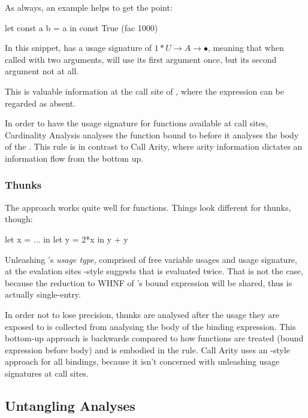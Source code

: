 As always, an example helps to get the point:
\begin{haskellcode}
  let const a b = a
  in const True (fac 1000) 
\end{haskellcode}

In this snippet,  has a usage signature of $1*U \to A \to \bullet$, meaning that when called with two arguments,  will use its first argument once, but its second argument not at all.

This is valuable information at the call site of , where the expression  can be regarded as absent.

In order to have the usage signature for functions available at call sites, Cardinality Analysis analyses the function bound to  before it analyses the body of the .
This  rule \parencite{card} is in contrast to Call Arity, where arity information dictates an information flow from the bottom up.

\subsubsection{Thunks}

The  approach works quite well for functions.
Things look different for thunks, though:
\begin{haskellcode}
  let x = ...
  in let y = 2*x
     in y + y
\end{haskellcode}

Unleashing 's \emph{usage type}, comprised of free variable usages and usage signature, at the evalation sites -style suggests that  is evaluated twice.
That is not the case, because the reduction to WHNF of 's bound expression will be shared, thus  is actually single-entry.

In order not to lose precision, thunks are analysed after the usage they are exposed to is collected from analysing the body of the binding  expression.
This bottom-up approach is backwards compared to how functions are treated (\eg bound expression before body) and is embodied in the  rule.
Call Arity uses an -style approach for all bindings, because it isn't concerned with unleashing usage signatures at call sites.

\subsection{Untangling Analyses}

